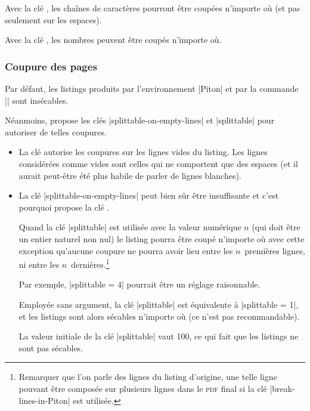\documentclass[dvipsnames,svgnames]{article}
\begin{document}
\bigskip
Avec la clé , les chaînes de caractères pourront être
coupées n'importe où (et pas seulement sur les espaces). 


\bigskip
Avec la clé , les nombres peuvent être coupés n'importe où.


\subsubsection{Coupure des pages}

\label{splittable}
\label{coupure-de-pages}


Par défaut, les listings produits par l'environnement |{Piton}| et par la commande
|\PitonInputFile| sont insécables.


Néanmoins,  propose les clés |splittable-on-empty-lines| et |splittable| pour
autoriser de telles coupures.

\begin{itemize}
\item La clé  autorise les coupures sur les lignes
vides du listing. Les lignes considérées comme vides sont celles qui ne comportent que des
espaces (et il aurait peut-être été plus habile de parler de lignes blanches). 

\medskip
\item La clé |splittable-on-empty-lines| peut bien sûr être insuffisante et c'est pourquoi
 propose la clé .

Quand la clé |splittable| est utilisée avec la valeur numérique $n$ (qui doit être un
entier naturel non nul) le listing pourra être coupé n'importe où avec cette exception
qu'aucune coupure ne pourra avoir lieu entre les $n$~premières lignes, ni entre les
$n$~dernières.\footnote{Remarquer que l'on parle des lignes du listing d'origine, une
  telle ligne pouvant être composée sur plusieurs lignes dans le \textsc{pdf} final si la
  clé |break-lines-in-Piton| est utilisée.}

Par exemple, |splittable = 4| pourrait être un réglage raisonnable.

Employée sans argument, la clé |splittable| est équivalente à |splittable = 1|, et les
listings sont alors sécables n'importe où (ce n'est pas recommandable).

La valeur initiale de la clé |splittable| vaut 100, ce qui fait que les listings ne sont
pas sécables. 
\end{itemize}
\end{document}
